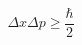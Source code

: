 \documentclass[12pt]{article}
\begin{document}
$$
\Delta x\Delta p\geq {\frac  {\hbar }{2}}
$$
\end{document}
